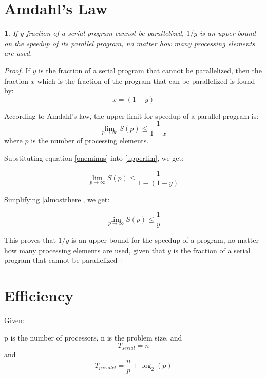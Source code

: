 \documentclass[letterpaper]{article}
\newtheorem{thm}{}
\begin{document}
\section{Amdahl's Law}
\label{sec:orgdefb9db}

\begin{thm}
    If \(y\) fraction of a serial program cannot be parallelized, \(1/y\) is an upper bound on the speedup of its parallel program, no matter how many processing elements are used.
\end{thm}

\begin{proof}
If \(y\) is the fraction of a serial program that cannot be parallelized, then the fraction \(x\) which is the fraction of the program that can be parallelized is found by:
\begin{equation}\label{oneminus}
x =  (1-y)
\end{equation}

According to Amdahl's law, the upper limit for speedup of a parallel program is:
\begin{equation}\label{upperlim}
\lim_{p \to \infty} S(p) \leq \frac{1}{1-x}
\end{equation}
where \(p\) is the number of processing elements.

Substituting equation \ref{oneminus} into \ref{upperlim}, we get:

\begin{equation}\label{almostthere}
\lim_{p \to \infty} S(p) \leq \frac{1}{1-(1-y)}
\end{equation}

Simplifying \ref{almostthere}, we get:

\begin{equation}
\lim_{p \to \infty} S(p) \leq \frac{1}{y}
\end{equation}

This proves that \(1/y\) is an upper bound for the speedup of a program, no matter how many processing elements are used, given that \(y\) is the fraction of a serial program that cannot be parallelized
\end{proof}

\section{Efficiency}
\label{sec:org0636ba2}
Given:

p is the number of processors, n is the problem size, and
\[T_{serial} = n\]
and
\[T_{parallel} = \frac{n}{p} + \log_2 (p)\]
\end{document}
